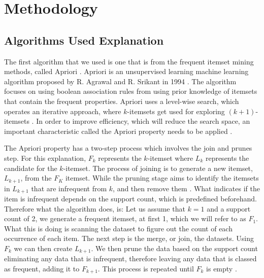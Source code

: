 \documentclass[a4paper,10pt]{article}
\begin{document}
\section{Methodology}

\subsection{Algorithms Used Explanation}

The first algorithm that we used is one that is from the frequent itemset mining methods, called Apriori \cite{han2011data}. Apriori is an unsupervised learning machine learning algorithm proposed by R. Agrawal and R. Srikant in 1994 \cite{agrawal1994fast, geron2019hands}. The algorithm focuses on using boolean association rules \cite{agrawal1994fast} from using prior knowledge of itemsets that contain the frequent properties. Apriori uses a level-wise search, which operates an iterative approach, where $k$-itemsets get used for exploring $(k+1)$-itemsets \cite{jingjingslides}. In order to improve efficiency, which will reduce the search space, an important characteristic called the Apriori property needs to be applied \cite{han2011data}. 

The Apriori property has a two-step process which involves the join and prunes step. For this explanation, $F_k$ represents the $k$-itemset where $L_k$ represents the candidate for the $k$-itemset. The process of joining is to generate a new itemset, $L_{k+1}$, from the $F_K$ itemset. While the pruning stage aims to identify the itemsets in $L_{k+1}$ that are infrequent from $k$, and then remove them \cite{jingjingslides}. What indicates if the item is infrequent depends on the support count, which is predefined beforehand. Therefore what the algorithm does, is: Let us assume that $k=1$ and a support count of 2, we generate a frequent itemset, at first 1, which we will refer to as $F_1$. What this is doing is scanning the dataset to figure out the count of each occurrence of each item. The next step is the merge, or join, the datasets. Using $F_k$ we can then create $L_{k+1}$. We then prune the data based on the support count eliminating any data that is infrequent, therefore leaving any data that is classed as frequent, adding it to $F_{k+1}$. This process is repeated until $F_k$ is empty \cite{jingjingslides, han2011data}.
\end{document}
